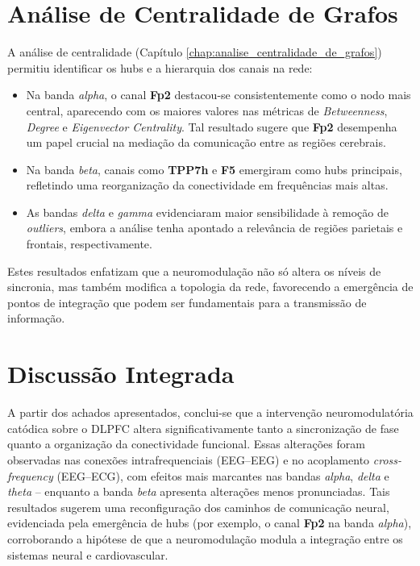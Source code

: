 \section{Análise de Centralidade de Grafos}
A análise de centralidade (Capítulo \ref{chap:analise_centralidade_de_grafos}) permitiu identificar os hubs e a hierarquia dos canais na rede:
\begin{itemize}
    \item Na banda \emph{alpha}, o canal \textbf{Fp2} destacou-se consistentemente como o nodo mais central, aparecendo com os maiores valores nas métricas de \textit{Betweenness}, \textit{Degree} e \textit{Eigenvector Centrality}. Tal resultado sugere que \textbf{Fp2} desempenha um papel crucial na mediação da comunicação entre as regiões cerebrais.
    \item Na banda \emph{beta}, canais como \textbf{TPP7h} e \textbf{F5} emergiram como hubs principais, refletindo uma reorganização da conectividade em frequências mais altas.
    \item As bandas \emph{delta} e \emph{gamma} evidenciaram maior sensibilidade à remoção de \textit{outliers}, embora a análise tenha apontado a relevância de regiões parietais e frontais, respectivamente.
\end{itemize}
Estes resultados enfatizam que a neuromodulação não só altera os níveis de sincronia, mas também modifica a topologia da rede, favorecendo a emergência de pontos de integração que podem ser fundamentais para a transmissão de informação.

\section{Discussão Integrada}
A partir dos achados apresentados, conclui-se que a intervenção neuromodulatória catódica sobre o DLPFC altera significativamente tanto a sincronização de fase quanto a organização da conectividade funcional. Essas alterações foram observadas nas conexões intrafrequenciais (EEG--EEG) e no acoplamento \textit{cross-frequency} (EEG--ECG), com efeitos mais marcantes nas bandas \emph{alpha}, \emph{delta} e \emph{theta} – enquanto a banda \emph{beta} apresenta alterações menos pronunciadas. Tais resultados sugerem uma reconfiguração dos caminhos de comunicação neural, evidenciada pela emergência de hubs (por exemplo, o canal \textbf{Fp2} na banda \emph{alpha}), corroborando a hipótese de que a neuromodulação modula a integração entre os sistemas neural e cardiovascular.


